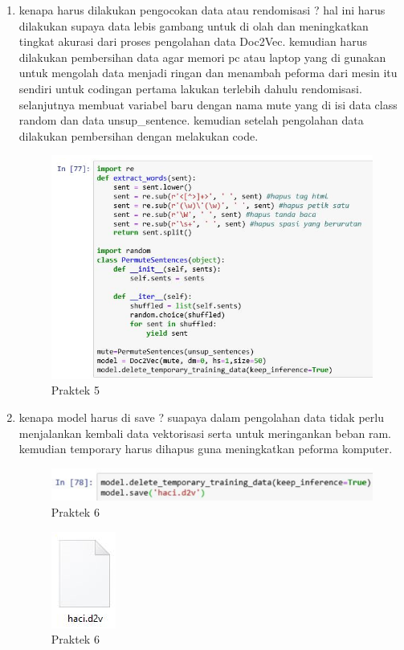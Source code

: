 \begin{enumerate}
\item kenapa harus dilakukan pengocokan data atau rendomisasi ? hal ini harus dilakukan supaya data lebis gambang untuk di olah dan meningkatkan tingkat akurasi dari proses pengolahan data Doc2Vec. kemudian harus dilakukan pembersihan data agar memori pc atau laptop yang di gunakan untuk mengolah data menjadi ringan dan menambah peforma dari mesin itu sendiri untuk codingan pertama lakukan terlebih dahulu rendomisasi. selanjutnya membuat variabel baru dengan nama mute yang di isi data class random dan data unsup\_sentence. kemudian setelah pengolahan data dilakukan pembersihan dengan melakukan code.

\begin{figure}[ht]
\centering
\includegraphics[scale=0.6]{figures/1174008/5/2,5.PNG}
\caption{Praktek 5}
\end{figure}

\item kenapa model harus di save ? suapaya dalam pengolahan data tidak perlu menjalankan kembali data vektorisasi serta untuk meringankan beban ram. kemudian temporary harus dihapus guna meningkatkan peforma komputer.

\begin{figure}[ht]
\centering
\includegraphics[scale=0.6]{figures/1174008/5/2,6.PNG}
\caption{Praktek 6}
\end{figure}

\begin{figure}[ht]
\centering
\includegraphics[scale=0.6]{figures/1174008/5/2,6,1.PNG}
\caption{Praktek 6}
\end{figure}


\end{enumerate}
